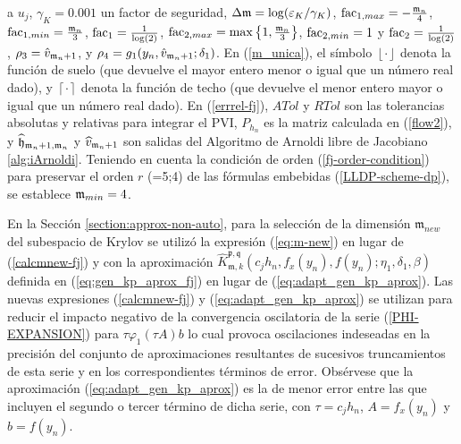 a $u_j$, $\gamma_{K}=0\mathord{.}001$ un factor de seguridad,
$\Delta\mathfrak{m}=\log(\varepsilon_{K}/\gamma_{K})$,
$\mathrm{fac}_{1,max}= -\frac{\mathfrak{m}_n}{4}$, $\mathrm{fac}_{1,min}= \frac{\mathfrak{m}_n}{3}$, $\mathrm{fac}_1=\frac{1} {\log(2)}$, $\mathrm{fac}_{2,max}= \max\left\{  1,\frac{\mathfrak{m}_{n}}{3}  \right\}$, $\mathrm{fac}_{2,min}= 1 $ y $\mathrm{fac}_2=\frac{1}{\log(2)}$, $\rho_3 =\hat{v}_{\mathfrak{m}_n+1}$, y $\rho_4 = g_1(y_n,\hat{v}_ {\mathfrak{m}_n+1};\delta_1)$. En (\ref{m_unica}), el símbolo $\left\lfloor \cdot \right\rfloor$ denota la función de suelo (que devuelve el mayor entero menor o igual que un número real dado), y $\left\lceil \cdot \right\rceil$ denota la función de techo (que devuelve el menor entero mayor o igual que un número real dado). En (\ref{errrel-fj}), $ATol$ y $RTol$ son las tolerancias absolutas y relativas para integrar el PVI, $P_{h_n}$ es la matriz calculada en (\ref{flow2}), y $\widehat {\mathfrak{h}}_{\mathfrak{m}_n+1,\mathfrak{m}_n}$ y $\widehat{v}_{\mathfrak{m}_n+1}$ son salidas del Algoritmo de Arnoldi libre de Jacobiano \ref{alg:iArnoldi}. Teniendo en cuenta la condición de orden (\ref{fj-order-condition}) para preservar el orden $r$ (=5;4) de las fórmulas embebidas (\ref{LLDP-scheme-dp}), se establece $\mathfrak{m}_{min}=4$.

En la Sección \ref{section:approx-non-auto}, para la selección de la dimensión $\mathfrak{m}_{new}$ del subespacio de Krylov se utilizó la expresión (\ref{eq:m-new}) en lugar de (\ref{calcmnew-fj}) y con la aproximación
$\widehat{K}_{\mathfrak{m},k}^{\mathfrak{p},\mathfrak{q}}\left(
c_{j}h_{n},f_{x}(y_{n}),f(y_{n});\eta _{1},\delta _{1},\beta \right)
$ definida en (\ref{eq:gen_kp_aprox_fj}) en lugar de (\ref{eq:adapt_gen_kp_aprox}). Las nuevas expresiones (\ref{calcmnew-fj}) y (\ref{eq:adapt_gen_kp_aprox}) se utilizan para reducir el impacto negativo de la convergencia oscilatoria de la serie (\ref{PHI-EXPANSION}) para $\tau\varphi_1(\tau A) b$ lo cual provoca oscilaciones indeseadas en la precisión del conjunto de aproximaciones resultantes de sucesivos truncamientos de esta serie y en los correspondientes términos de error. Obsérvese que la aproximación (\ref{eq:adapt_gen_kp_aprox}) es la de menor error entre las que incluyen el segundo o tercer término de dicha serie, con $\tau = c_jh_n$, $A=f_x(y_n)$ y $b=f(y_n)$.

